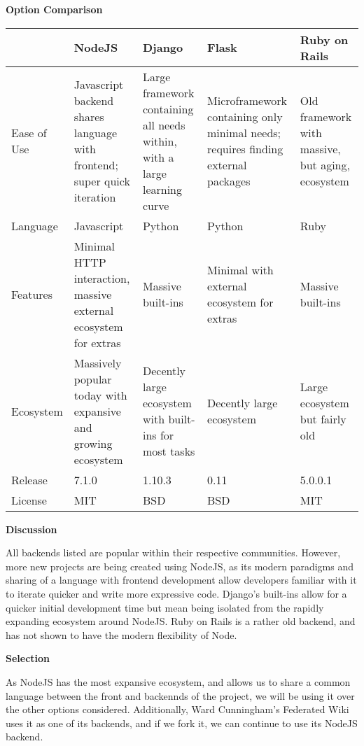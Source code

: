 \documentclass[letterpaper, 10pt, draftclsnofoot, compsoc, onecolumn]{IEEEtran}
\begin{document}
{%

\newpage
{\noindent\rmfamily\bfseries\color{black} Option Comparison \par}
\vspace{1pc}
\tablehead{}
\begin{supertabular}{|p{2cm}|p{2.5cm}|p{2.5cm}|p{2.5cm}|p{2.5cm}|}
\hline & NodeJS & Django  & Flask  & Ruby on Rails \\ \hline
Ease of Use
  & Javascript backend shares language with frontend; super quick iteration
  & Large framework containing all needs within, with a large learning curve
  & Microframework containing only minimal needs; requires finding external packages
  & Old framework with massive, but aging, ecosystem \\ \hline
Language
  & Javascript
  & Python
  & Python
  & Ruby \\ \hline
Features
  & Minimal HTTP interaction, massive external ecosystem for extras
  & Massive built-ins
  & Minimal with external ecosystem for extras
  & Massive built-ins \\ \hline
Ecosystem
  & Massively popular today with expansive and growing ecosystem
  & Decently large ecosystem with built-ins for most tasks
  & Decently large ecosystem
  & Large ecosystem but fairly old \\ \hline
Release
  & 7.1.0
  & 1.10.3
  & 0.11
  & 5.0.0.1 \\ \hline
License
  & MIT
  & BSD
  & BSD
  & MIT \\ \hline
\end{supertabular}

\newpage
{\noindent\rmfamily\bfseries\color{black} Discussion \par}
{\noindent
All backends listed are popular within their respective communities. However, more new projects are being created using NodeJS, as its modern paradigms and sharing of a language with frontend development allow developers familiar with it to iterate quicker and write more expressive code. Django's built-ins allow for a quicker initial development time but mean being isolated from the rapidly expanding ecosystem around NodeJS.
Ruby on Rails is a rather old backend, and has not shown to have the modern flexibility of Node.
 \par}

\medskip
{\noindent\rmfamily\bfseries\color{black} Selection \par}
{\noindent As NodeJS has the most expansive ecosystem, and allows us to share a common language between the front and backennds of the project, we will be using it over the other options considered. Additionally, Ward Cunningham's Federated Wiki uses it as one of its backends, and if we fork it, we can continue to use its NodeJS backend. \par}

}
\end{document}
